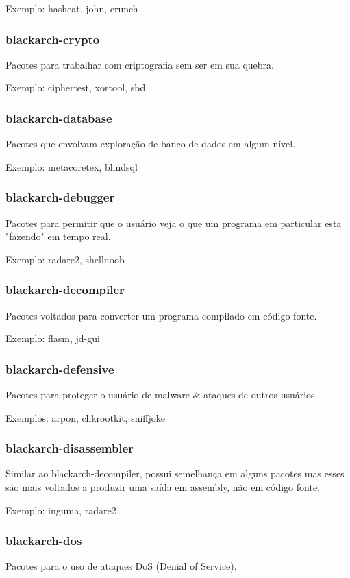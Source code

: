 \documentclass[a4paper, oneside, 11pt]{book}
\begin{document}
Exemplo: hashcat, john, crunch

\subsubsection{blackarch-crypto}
Pacotes para trabalhar com criptografia sem ser em sua quebra.

Exemplo: ciphertest, xortool, sbd

\subsubsection{blackarch-database}
Pacotes que envolvam exploração de banco de dados em algum nível.

Exemplo: metacoretex, blindsql

\subsubsection{blackarch-debugger}
Pacotes para permitir que o usuário veja o que um programa em particular esta "fazendo" em tempo real.

Exemplo: radare2, shellnoob

\subsubsection{blackarch-decompiler}
Pacotes voltados para converter um programa compilado em código fonte.

Exemplo: flasm, jd-gui

\subsubsection{blackarch-defensive}
Pacotes para proteger o usuário de malware \& ataques de outros usuários.

Exemplos: arpon, chkrootkit, sniffjoke

\subsubsection{blackarch-disassembler}
Similar ao blackarch-decompiler, possui semelhança em alguns pacotes mas esses são mais voltados a produzir uma saída em assembly, não em código fonte.

Exemplo: inguma, radare2

\subsubsection{blackarch-dos}
Pacotes para o uso de ataques DoS (Denial of Service).
\end{document}
